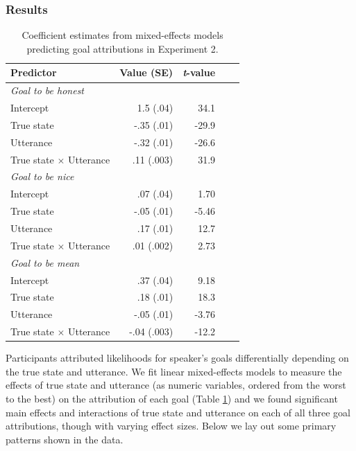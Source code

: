 \documentclass[10pt,letterpaper]{article}
\begin{document}
\subsubsection{Results}

\begin{table}[t]
\caption{\label{tab:lmer1}  Coefficient estimates from mixed-effects models predicting goal attributions in Experiment 2.} 
\begin{center} 
\begin{tabular}{l r r r l} 
\hline
Predictor  &  Value (SE) & \emph{t}-value\\
\hline
\emph{Goal to be honest} \\
Intercept  & 1.5 (.04) & 34.1 \\
True state & -.35 (.01) &  -29.9 \\
Utterance & -.32 (.01) & -26.6 \\
True state $\times$ Utterance & .11 (.003) & 31.9 \\
\emph{Goal to be nice} \\
Intercept  & .07 (.04) & 1.70\\
True state & -.05 (.01) &  -5.46 \\
Utterance & .17 (.01) & 12.7 \\
True state $\times$ Utterance & .01 (.002) & 2.73 \\
\emph{Goal to be mean} \\ 
Intercept  & .37 (.04) & 9.18 \\
True state & .18 (.01) &  18.3 \\
Utterance & -.05 (.01) & -3.76 \\
True state $\times$ Utterance & -.04 (.003) & -12.2 \\
\hline
\end{tabular} 
\end{center} 
\end{table}

Participants attributed likelihoods for speaker's goals differentially depending on the true state and utterance. We fit linear mixed-effects models to measure the effects of true state and utterance (as numeric variables, ordered from the worst to the best) on the attribution of each goal (Table \ref{tab:lmer1}) and we found significant main effects and interactions of true state and utterance on each of all three goal attributions, though with varying effect sizes. Below we lay out some primary patterns shown in the data. %
\end{document}
